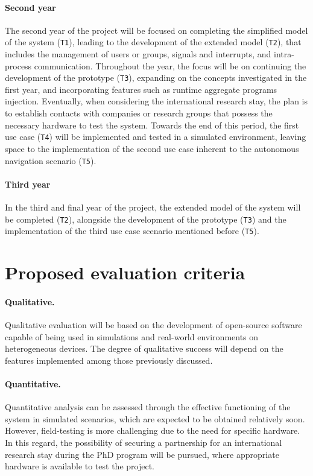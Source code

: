 \documentclass[12pt, a4paper]{article}
\begin{document}
\paragraph{Second year}
The second year of the project will be focused on completing the simplified model of the system (\texttt{T1}),
leading to the development of the extended model (\texttt{T2}),
that includes the management of users or groups, signals and interrupts, and intra-process communication.
%
Throughout the year,
the focus will be on continuing the development of the prototype (\texttt{T3}),
expanding on the concepts investigated in the first year,
and incorporating features such as runtime aggregate programs injection.
%
Eventually,
when considering the international research stay,
the plan is to establish contacts with companies or research groups that possess the necessary hardware to test the system.
%
Towards the end of this period,
the first use case (\texttt{T4}) will be implemented and tested in a simulated environment,
leaving space to the implementation of the second use case inherent to the autonomous navigation scenario (\texttt{T5}).

\sloppypar
\paragraph{Third year}
In the third and final year of the project,
the extended model of the system will be completed (\texttt{T2}), alongside the development of the prototype (\texttt{T3})
and the implementation of the third use case scenario mentioned before (\texttt{T5}).

\section{Proposed evaluation criteria}\label{sec:proposed-evaluation-criteria}

\sloppypar
\paragraph{Qualitative.}
Qualitative evaluation will be based on the development of open-source software capable of being used in simulations and real-world
environments on heterogeneous devices.
%
The degree of qualitative success will depend on the features implemented among those previously discussed.

\sloppypar
\paragraph{Quantitative.}
Quantitative analysis can be assessed through the effective functioning of the system in simulated scenarios,
which are expected to be obtained relatively soon.
%
However,
field-testing is more challenging due to the need for specific hardware.
%
In this regard,
the possibility of securing a partnership for an international research stay during the PhD program will be pursued,
where appropriate hardware is available to test the project.
\end{document}
